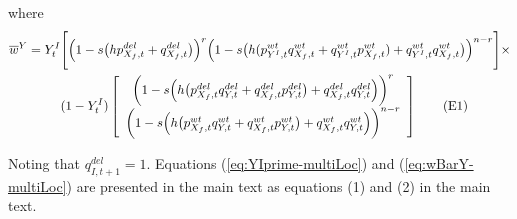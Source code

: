 \documentclass{article}
\newcommand\numberthis{\addtocounter{equation}{1}\tag{\theequation}}
\begin{document}
\begin{appendices}
\noindent where 
\begin{align*}\label{eq:wBarY-multiLoc}
	\overline{w}^Y = Y^I_t &\Bigg[ \Big(1 - s \big(h p^{del}_{X_f,t} + q^{del}_{X_f,t} \big) \Big)^{r}\Big(1 - s \big(h (p^{wt}_{Y^I,t} q^{wt}_{X_f,t} + q^{wt}_{Y^I,t} p^{wt}_{X_f,t}) + q^{wt}_{Y^I,t} q^{wt}_{X_f,t} \big) \Big)^{n-r} \Bigg] \times \\
	&(1 - Y^I_t) \left[\begin{array}{c}
											\bigg( 1 - s \Big( h \big( p^{del}_{X_f,t} q^{del}_{Y,t} +  q^{del}_{X_f,t} p^{del}_{Y,t} \big) + q^{del}_{X_f,t} q^{del}_{Y,t} \Big) \bigg)^r\\
											\bigg( 1 - s \Big( h \big( p^{wt}_{X_f,t} q^{wt}_{Y,t} +  q^{wt}_{X_f,t} p^{wt}_{Y,t} \big) + q^{wt}_{X_f,t} q^{wt}_{Y,t} \Big) \bigg)^{n-r}
											\end{array} \right] \numberthis
\end{align*}

\noindent Noting that $q^{del}_{I,{t+1}} = 1$. Equations (\ref{eq:YIprime-multiLoc}) and (\ref{eq:wBarY-multiLoc}) are presented in the main text as equations (1) and (2) in the main text.






\end{appendices}
\end{document}
